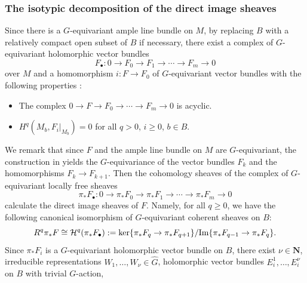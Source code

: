 \documentclass[amscd, leqno]{amsart}
\theoremstyle{plain}
\theoremstyle{definition}
\theoremstyle{remark}
\begin{document}
\subsubsection
{The isotypic decomposition of the direct image sheaves}
\label{sect:1.3.1}
\par
Since there is a $G$-equivariant ample line bundle on $M$, by replacing $B$ with a relatively compact open subset of $B$ if necessary, 
there exist a complex of $G$-equivariant holomorphic vector bundles 
$$
F_{\bullet} \colon 0\longrightarrow F_{0}\longrightarrow F_{1}\longrightarrow \cdots\longrightarrow F_{m}\longrightarrow0
$$
over $M$ and a homomorphism $i \colon F\to F_{0}$ of $G$-equivariant vector bundles with the following properties \cite[Sect.\,7.2.7]{Quillen73}:
\begin{itemize}
\item[(i)]
The complex $0\to F\to F_{0}\to\cdots\to F_{m}\to0$ is acyclic.
\item[(ii)]
$H^{q}(M_{b},F_{i}|_{M_{b}})=0$ for all $q>0$, $i\geq0$, $b \in B$. 
\end{itemize}
We remark that since $F$ and the ample line bundle on $M$ are $G$-equivariant, the construction in \cite[Sect.\,7.2.7]{Quillen73} 
yields the $G$-equivariance of the vector bundles $F_{k}$ and the homomorphisms $F_{k} \to F_{k+1}$.
Then the cohomology sheaves of the complex of $G$-equivariant locally free sheaves
\begin{equation}
\label{eqn:complex:v:b}
\pi_{*}F_{\bullet} \colon 0 \longrightarrow \pi_{*}F_{0} \longrightarrow \pi_{*}F_{1} \longrightarrow\cdots\longrightarrow 
\pi_{*}F_{m} \longrightarrow 0
\end{equation}
calculate the direct image sheaves of $F$. Namely, for all $q\geq0$, 
we have the following canonical isomorphism of $G$-equivariant coherent sheaves on $B$:
\begin{equation}
\label{eqn:direct:im}
R^{q}\pi_{*}F \cong {\mathcal H}^{q}(\pi_{*}F_{\bullet}) := \ker\{\pi_{*}F_{q}\to\pi_{*}F_{q+1}\}/{\rm Im}\{\pi_{*}F_{q-1}\to\pi_{*}F_{q}\}.
\end{equation}
Since $\pi_{*}F_{i}$ is a $G$-equivariant holomorphic vector bundle on $B$, there exist $\nu \in {\mathbf N}$, irreducible representations 
$W_{1},\ldots,W_{\nu} \in \widehat{G}$, holomorphic vector bundles $E_{i}^{1}, \ldots, E_{i}^{\nu}$ on $B$ with trivial $G$-action, 
\end{document}
